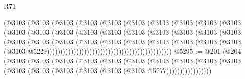 \begin{lexlean}{R71}
\begin{coremodule}
                                    (@3103
                                      (@3103
                                        (@3103
                                          (@3103
                                            (@3103
                                              (@3103
                                                (@3103
                                                  (@3103
                                                    (@3103
                                                      (@3103
                                                        (@3103
                                                          (@3103
                                                            (@3103
                                                              (@3103
                                                                (@3103
                                                                  (@3103
                                                                    (@3103
                                                                      (@3103
                                                                        (@3103
                                                                          (@3103
                                                                            (@3103
                                                                              (@3103
                                                                                (@3103
                                                                                  (@3103
                                                                                    (@3103
                                                                                      (@3103
                                                                                        (@3103
                                                                                          (@3103
                                                                                            (@3103
                                                                                              (@3103
                                                                                                (@3103
                                                                                                  @5229)))))))))))))))))))))))))))))))))))))))))))))))
@5295 := @201
    (@204
      (@3103
        (@3103
          (@3103
            (@3103
              (@3103
                (@3103
                  (@3103
                    (@3103
                      (@3103 (@3103 (@3103 (@3103 (@3103 (@3103 (@3103 (@3103 @5277)))))))))))))))))

\end{coremodule}
\end{lexlean}
